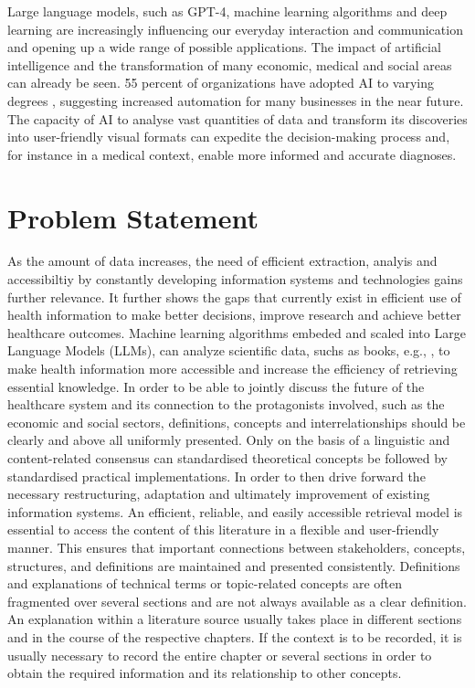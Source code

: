 Large language models, such as GPT-4, machine learning algorithms and deep learning are increasingly influencing our everyday interaction and communication and opening up a wide range of possible applications. 
The impact of artificial intelligence and the transformation of many economic, medical and social areas can already be seen. 
55 percent of organizations have adopted AI to varying degrees \citep{mckinsey_ai_2023}, suggesting increased automation for many businesses in the near future. 
The capacity of AI to analyse vast quantities of data and transform its discoveries into user-friendly visual formats can expedite the decision-making process and, for instance in a medical context,  enable more informed and accurate diagnoses.\citep{esteva_skin_cancer}

\section{Problem Statement}
As the amount of data increases, the need of efficient extraction, analyis and accessibiltiy by constantly developing information systems and technologies gains further relevance. 
It further shows the gaps that currently exist in efficient use of health information to make better decisions, improve research and achieve better healthcare outcomes. 
Machine learning algorithms embeded and scaled into Large Language Models (LLMs), can analyze scientific data, suchs as books, e.g., \citet{bb}, to make health information more accessible and increase the efficiency of retrieving essential knowledge. 
In order to be able to jointly discuss the future of the healthcare system and its connection to the protagonists involved, such as the economic and social sectors, definitions, concepts and interrelationships should be clearly and above all uniformly presented. 
Only on the basis of a linguistic and content-related consensus can standardised theoretical concepts be followed by standardised practical implementations. In order to then drive forward the necessary restructuring, adaptation and ultimately improvement of existing information systems. 
An efficient, reliable, and easily accessible retrieval model is essential to access the content of this literature in a flexible and user-friendly manner. This ensures that important connections between stakeholders, concepts, structures, and definitions are maintained and presented consistently. 
Definitions and explanations of technical terms or topic-related concepts are often fragmented over several sections and are not always available as a clear definition. An explanation within a literature source usually takes place in different sections and in the course of the respective chapters. If the context is to be recorded, it is usually necessary to record the entire chapter or several sections in order to obtain the required information and its relationship to other concepts.


